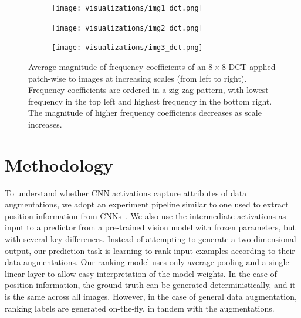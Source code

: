 \begin{figure}
    \begin{subfigure}[b]{0.32\textwidth}
    \centering
    \texttt{[image: visualizations/img1\_dct.png]}
    \caption{}
    \end{subfigure}
    \begin{subfigure}[b]{0.32\textwidth}
    \centering
    \texttt{[image: visualizations/img2\_dct.png]}
    \caption{}
    \end{subfigure}
    \begin{subfigure}[b]{0.32\textwidth}
    \centering
    \texttt{[image: visualizations/img3\_dct.png]}
    \caption{}
    \end{subfigure}
    \caption{Average magnitude of frequency coefficients of an $8 \times 8$ DCT applied patch-wise to images at increasing scales (from left to right). Frequency coefficients are ordered in a zig-zag pattern, with lowest frequency in the top left and highest frequency in the bottom right. The magnitude of higher frequency coefficients decreases as scale increases.}
    \label{fig:dct}
\end{figure}



\section{Methodology}
To understand whether CNN activations capture attributes of data augmentations, we adopt an experiment pipeline similar to one used to extract position information from CNNs~\cite{islam2019much}.
We also use the intermediate activations as input to a predictor from a pre-trained vision model with frozen parameters, but with several key differences.
Instead of attempting to generate a two-dimensional output, our prediction task is learning to rank input examples according to their data augmentations.
Our ranking model uses only average pooling and a single linear layer to allow easy interpretation of the model weights.
In the case of position information, the ground-truth can be generated deterministically, and it is the same across all images.
However, in the case of general data augmentation, ranking labels are generated on-the-fly, in tandem with the augmentations.







